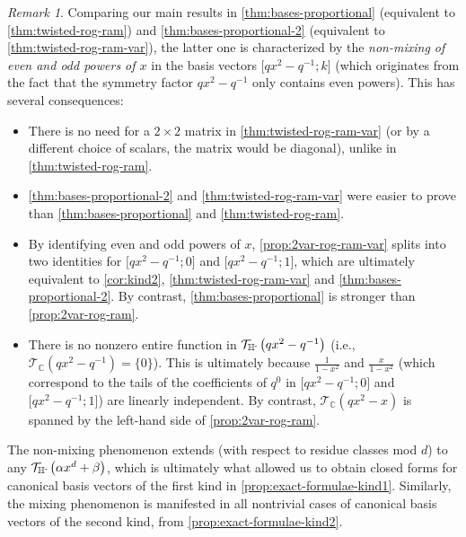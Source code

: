\documentclass[reqno,11pt]{amsart}
\theoremstyle{definition}
\theoremstyle{remark}
\newtheorem*{remark}{Remark}
\numberwithin{equation}{section}
\newcommand{\C}{\mathbb{C}}
\newcommand{\Hminus}{{\mathbb{H}^{\textnormal{-}\hspace{-0.03cm}}}}
\newcommand{\mT}{\mathcal{T}}
\newcommand{\vect}[2]{\big[{#1};{#2}\big]}
\begin{document}
\begin{remark}
Comparing our main results in \cref{thm:bases-proportional} (equivalent to \cref{thm:twisted-rog-ram}) and \cref{thm:bases-proportional-2} (equivalent to \cref{thm:twisted-rog-ram-var}), the latter one is characterized by the
\emph{non-mixing of even and odd powers of $x$} in the basis vectors $\vect{qx^2 - q^{-1}}{k}$ (which originates from the fact that the symmetry factor $qx^2 - q^{-1}$ only contains even powers). This has several consequences:
\begin{itemize}
    \item[(i).] There is no need for a $2 \times 2$ matrix in \cref{thm:twisted-rog-ram-var} (or by a different choice of scalars, the matrix would be diagonal), unlike in \cref{thm:twisted-rog-ram}. 
    \item[(ii).] \cref{thm:bases-proportional-2} and \cref{thm:twisted-rog-ram-var} were easier to prove than \cref{thm:bases-proportional} and \cref{thm:twisted-rog-ram}.
    \item[(iii).] By identifying even and odd powers of $x$, \cref{prop:2var-rog-ram-var} splits into two identities for $\vect{qx^2 - q^{-1}}{0}$ and $\vect{qx^2 - q^{-1}}{1}$, which are ultimately equivalent to \cref{cor:kind2}, \cref{thm:twisted-rog-ram-var} and \cref{thm:bases-proportional-2}. By contrast, \cref{thm:bases-proportional} is stronger than \cref{prop:2var-rog-ram}.
    \item[(iv).] There is no nonzero entire function in $\mT_\Hminus\left(qx^2 - q^{-1}\right)$ (i.e., $\mT_\C\left(qx^2 - q^{-1}\right) = \{0\}$). This is ultimately because $\frac{1}{1-x^2}$ and $\frac{x}{1-x^2}$ (which correspond to the tails of the coefficients of $q^0$ in $\vect{qx^2 - q^{-1}}{0}$ and $\vect{qx^2 - q^{-1}}{1}$) are linearly independent. By contrast, $\mT_\C\left(qx^2 - x\right)$ is spanned by the left-hand side of \cref{prop:2var-rog-ram}.
\end{itemize}
The non-mixing phenomenon extends (with respect to residue classes mod $d$) to any $\mT_\Hminus\left(\alpha x^d + \beta\right)$, which is ultimately what allowed us to obtain closed forms for canonical basis vectors of the first kind in \cref{prop:exact-formulae-kind1}. Similarly, the mixing phenomenon is manifested in all nontrivial cases of canonical basis vectors of the second kind, from \cref{prop:exact-formulae-kind2}.
\end{remark}

\end{document}
